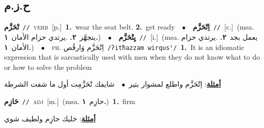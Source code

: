 \documentclass[10pt,a4paper,twoside]{article} %
\begin{document}
\begin{multicols}{2}
\vspace{-3mm}
\subsection*{\color{blue}\foreignlanguage{arabic}{ح.ز.م}\color{blue}{}} 

{\setlength\topsep{0pt}\textbf{\foreignlanguage{arabic}{تْحَزَّم}}\ {\color{gray}\texttt{//}\color{black}}\ \textsc{verb}\ [p.]\ \textbf{1.}~wear the seat belt.  \textbf{2.}~get ready\ \ $\bullet$\ \ \setlength\topsep{0pt}\textbf{\foreignlanguage{arabic}{اِتْحَزَّم}}\ {\color{gray}\texttt{//}\color{black}}\ [c.]\ \color{gray}(msa. \foreignlanguage{arabic}{يتجهَّز}~\foreignlanguage{arabic}{\textbf{٢.}}  .\foreignlanguage{arabic}{يرتدي حزام الأمان}~\foreignlanguage{arabic}{\textbf{١.}})\color{black}\ \ $\bullet$\ \ \setlength\topsep{0pt}\textbf{\foreignlanguage{arabic}{يِتْحَزَّم}}\ {\color{gray}\texttt{//}\color{black}}\ [i.]\ \color{gray}(msa. \foreignlanguage{arabic}{يعمل بجد}~\foreignlanguage{arabic}{\textbf{٢.}}  .\foreignlanguage{arabic}{يرتدي حزام الأمان}~\foreignlanguage{arabic}{\textbf{١.}})\color{black}\ \ $\bullet$\ \ \textsc{ph.} \color{gray} \foreignlanguage{arabic}{اِتْحَزَّم وَارقُص}\color{black}\ {\color{gray}\texttt{/{\sffamily ʔitħazzam wirqusˤ}/}\color{black}}\ \textbf{1.}~It is an idiomatic expression that is sarcastically used with men when they do not know what to do or how to solve the problem\  \begin{flushright}\color{gray}\foreignlanguage{arabic}{\textbf{\underline{\foreignlanguage{arabic}{أمثلة}}}: اِتْحَزَّم واطلع لمشوار بتير\ $\bullet$\ \  شايفك تْحَزَّمِت أول ما شفت الشرطة}\end{flushright}\color{black}} \vspace{2mm}

{\setlength\topsep{0pt}\textbf{\foreignlanguage{arabic}{حَازِم}}\ {\color{gray}\texttt{//}\color{black}}\ \textsc{adj}\ [m.]\ \color{gray}(msa. \foreignlanguage{arabic}{حازِم}~\foreignlanguage{arabic}{\textbf{١.}})\color{black}\ \textbf{1.}~firm\  \begin{flushright}\color{gray}\foreignlanguage{arabic}{\textbf{\underline{\foreignlanguage{arabic}{أمثلة}}}: خليك حازِم ولطيف شوي}\end{flushright}\color{black}} \vspace{2mm}


\end{multicols}
\end{document}
